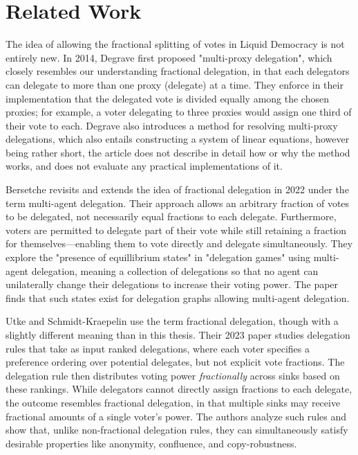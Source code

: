 
\chapter{Related Work}
\label{chap:related_work}

The idea of allowing the fractional splitting of votes in Liquid Democracy is not entirely new. In 2014, Degrave first proposed "multi-proxy delegation", which closely resembles our understanding fractional delegation, in that each delegators can delegate to more than one proxy (delegate) at a time. They enforce in their implementation that the delegated vote is divided equally among the chosen proxies; for example, a voter delegating to three proxies would assign one third of their vote to each. Degrave also introduces a method for resolving multi-proxy delegations, which also entails constructing a system of linear equations, however being rather short, the article does not describe in detail how or why the method works, and does not evaluate any practical implementations of it. \cite{degraveResolvingMultiproxyTransitive2014}

Bersetche revisits and extends the idea of fractional delegation in 2022 under the term multi-agent delegation. Their approach allows an arbitrary fraction of votes to be delegated, not necessarily equal fractions to each delegate. Furthermore, voters are permitted to delegate part of their vote while still retaining a fraction for themselves—enabling them to vote directly and delegate simultaneously. They explore the "presence of equillibrium states" in "delegation games" using multi-agent delegation, meaning a collection of delegations so that no agent can unilaterally change their delegations to increase their voting power. The paper finds that such states exist for delegation graphs allowing multi-agent delegation.  \cite{bersetcheGeneralizingLiquidDemocracy2022}

Utke and Schmidt-Kraepelin use the term fractional delegation, though with a slightly different meaning than in this thesis. Their 2023 paper studies delegation rules that take as input ranked delegations, where each voter specifies a preference ordering over potential delegates, but not explicit vote fractions. The delegation rule then distributes voting power \textit{fractionally} across sinks based on these rankings. While delegators cannot directly assign fractions to each delegate, the outcome resembles fractional delegation, in that multiple sinks may receive fractional amounts of a single voter's power. The authors analyze such rules and show that, unlike non-fractional delegation rules, they can simultaneously satisfy desirable properties like anonymity, confluence, and copy-robustness. \cite{NEURIPS2023_dbb51809}

